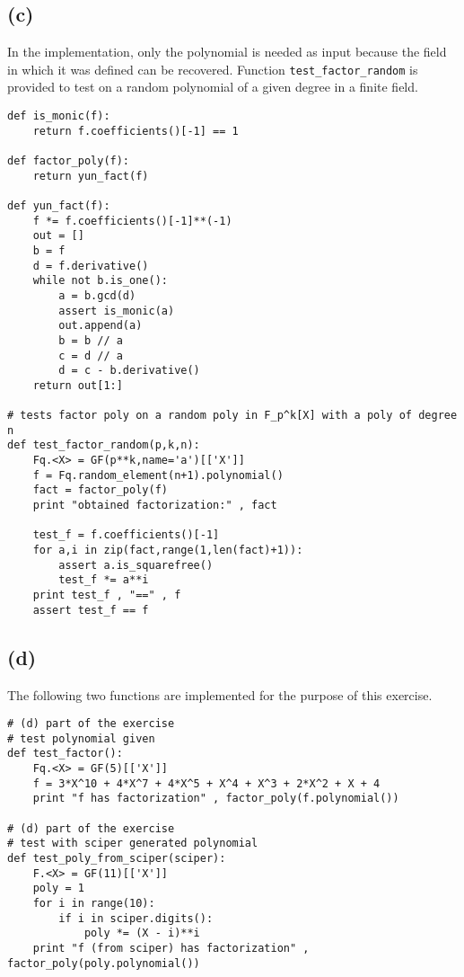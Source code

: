 \documentclass[12pt,a4paper]{article}
\begin{document}
\subsection*{(c)}
In the implementation, only the polynomial is needed as input because the field in which it was defined can be recovered.
Function \texttt{test\_factor\_random} is provided to test on a random polynomial of a given degree in a finite field. 

\belowcaptionskip=-10pt
\begin{lstlisting}[label=fact,caption=Yun's Algorithm]
def is_monic(f):
    return f.coefficients()[-1] == 1

def factor_poly(f):
    return yun_fact(f)

def yun_fact(f):
    f *= f.coefficients()[-1]**(-1)
    out = []
    b = f
    d = f.derivative()
    while not b.is_one():
        a = b.gcd(d)
        assert is_monic(a)
        out.append(a)
        b = b // a
        c = d // a
        d = c - b.derivative()
    return out[1:] 

# tests factor poly on a random poly in F_p^k[X] with a poly of degree n
def test_factor_random(p,k,n):
    Fq.<X> = GF(p**k,name='a')[['X']]
    f = Fq.random_element(n+1).polynomial()
    fact = factor_poly(f)
    print "obtained factorization:" , fact
    
    test_f = f.coefficients()[-1]
    for a,i in zip(fact,range(1,len(fact)+1)):
        assert a.is_squarefree()
        test_f *= a**i
    print test_f , "==" , f
    assert test_f == f
\end{lstlisting}

\subsection*{(d)}
The following two functions are implemented for the purpose of this exercise.
\begin{lstlisting}[caption=Test Factorization]
# (d) part of the exercise
# test polynomial given
def test_factor():
    Fq.<X> = GF(5)[['X']]
    f = 3*X^10 + 4*X^7 + 4*X^5 + X^4 + X^3 + 2*X^2 + X + 4
    print "f has factorization" , factor_poly(f.polynomial())

# (d) part of the exercise
# test with sciper generated polynomial
def test_poly_from_sciper(sciper):
    F.<X> = GF(11)[['X']]
    poly = 1
    for i in range(10):
        if i in sciper.digits():
            poly *= (X - i)**i
    print "f (from sciper) has factorization" , factor_poly(poly.polynomial())
\end{lstlisting}
\end{document}
